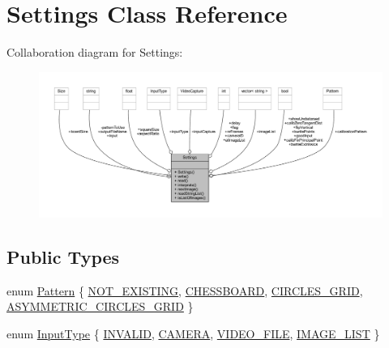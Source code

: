 \hypertarget{class_settings}{}\section{Settings Class Reference}
\label{class_settings}


Collaboration diagram for Settings\+:
\nopagebreak
\begin{figure}[H]
\begin{center}
\leavevmode
\includegraphics[width=350pt]{class_settings__coll__graph}
\end{center}
\end{figure}
\subsection*{Public Types}
\begin{DoxyCompactItemize}
\item 
enum \mbox{\hyperlink{class_settings_a0e7117abd9427a6f8bc1d1d8d456b5c8}{Pattern}} \{ \mbox{\hyperlink{class_settings_a0e7117abd9427a6f8bc1d1d8d456b5c8ad2f421ce100bd7e0302b17bda1a74eb9}{N\+O\+T\+\_\+\+E\+X\+I\+S\+T\+I\+NG}}, 
\mbox{\hyperlink{class_settings_a0e7117abd9427a6f8bc1d1d8d456b5c8ae96aa2d60b4a554a215524a05b32908e}{C\+H\+E\+S\+S\+B\+O\+A\+RD}}, 
\mbox{\hyperlink{class_settings_a0e7117abd9427a6f8bc1d1d8d456b5c8a79472d1c69f8ed7aa1b55f908b136f68}{C\+I\+R\+C\+L\+E\+S\+\_\+\+G\+R\+ID}}, 
\mbox{\hyperlink{class_settings_a0e7117abd9427a6f8bc1d1d8d456b5c8a2cea29ee5896f2cb4cc64df25fd2375b}{A\+S\+Y\+M\+M\+E\+T\+R\+I\+C\+\_\+\+C\+I\+R\+C\+L\+E\+S\+\_\+\+G\+R\+ID}}
 \}
\item 
enum \mbox{\hyperlink{class_settings_a5afe85d24b071973a7f248c05386f7f4}{Input\+Type}} \{ \mbox{\hyperlink{class_settings_a5afe85d24b071973a7f248c05386f7f4adb44130895aedc32a119565eb6d61bed}{I\+N\+V\+A\+L\+ID}}, 
\mbox{\hyperlink{class_settings_a5afe85d24b071973a7f248c05386f7f4aba4cc7726878c8913831f0ea6360fa05}{C\+A\+M\+E\+RA}}, 
\mbox{\hyperlink{class_settings_a5afe85d24b071973a7f248c05386f7f4ac9fd97535bc651249f9eed1fddf2d36b}{V\+I\+D\+E\+O\+\_\+\+F\+I\+LE}}, 
\mbox{\hyperlink{class_settings_a5afe85d24b071973a7f248c05386f7f4a292bd2e5ba912a92ace1606e366edc4d}{I\+M\+A\+G\+E\+\_\+\+L\+I\+ST}}
 \}
\end{DoxyCompactItemize}
